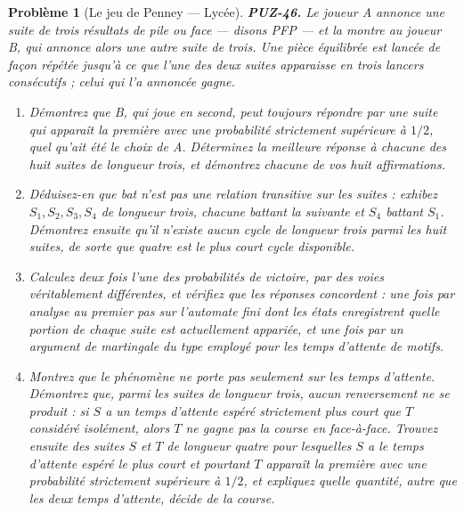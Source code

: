 \documentclass[11pt]{article}
\newtheorem{problem}{Problème}
\begin{document}
\begin{problem}[{Le jeu de Penney --- Lycée}]
\textbf{PUZ-46.} Le joueur A annonce une suite de trois résultats de pile ou face --- disons
PFP --- et la montre au joueur B, qui annonce alors une autre suite de trois. Une pièce
équilibrée est lancée de façon répétée jusqu'à ce que l'une des deux suites apparaisse en
trois lancers consécutifs ; celui qui l'a annoncée gagne.
\begin{enumerate}
\item[(a)] Démontrez que B, qui joue en second, peut toujours répondre par une suite qui apparaît
la première avec une probabilité strictement supérieure à $ 1/2 $, quel qu'ait été le
choix de A. Déterminez la meilleure réponse à chacune des huit suites de longueur trois, et
démontrez chacune de vos huit affirmations.
\item[(b)] Déduisez-en que \og{} bat \fg{} n'est pas une relation transitive sur les suites : exhibez
$ S_1, S_2, S_3, S_4 $ de longueur trois, chacune battant la suivante et $ S_4 $ battant
$ S_1 $. Démontrez ensuite qu'il n'existe aucun cycle de longueur trois parmi les huit
suites, de sorte que quatre est le plus court cycle disponible.
\item[(c)] Calculez deux fois l'une des probabilités de victoire, par des voies véritablement
différentes, et vérifiez que les réponses concordent : une fois par analyse au premier pas
sur l'automate fini dont les états enregistrent quelle portion de chaque suite est
actuellement appariée, et une fois par un argument de martingale du type employé pour les
temps d'attente de motifs.
\item[(d)] Montrez que le phénomène ne porte pas seulement sur les temps d'attente. Démontrez que,
parmi les suites de longueur trois, aucun renversement ne se produit : si $ S $ a un temps
d'attente espéré strictement plus court que $ T $ considéré isolément, alors $ T $ ne
gagne pas la course en face-à-face. Trouvez ensuite des suites $ S $ et $ T $ de
longueur \textit{quatre} pour lesquelles $ S $ a le temps d'attente espéré le plus court et
pourtant $ T $ apparaît la première avec une probabilité strictement supérieure à
$ 1/2 $, et expliquez quelle quantité, autre que les deux temps d'attente, décide de la
course.
\end{enumerate}

\end{problem}
\end{document}
